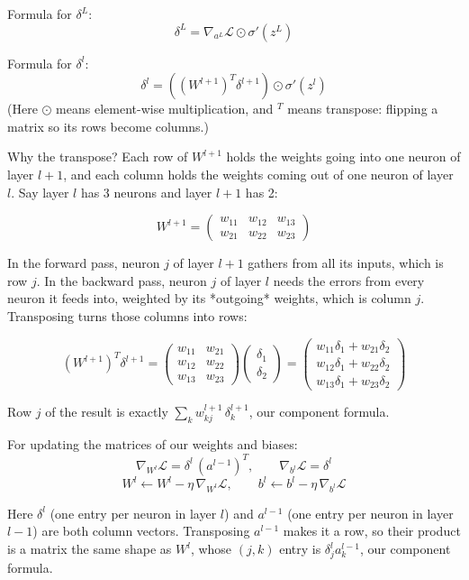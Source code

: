 \documentclass{article}
\begin{document}
Formula for $\delta^L$:
\[\delta^L = \nabla_{a^L}\mathcal{L}\odot\sigma'(z^L)\]

Formula for $\delta^l$:
\[{\delta^l = \left( (W^{l+1})^T \delta^{l+1} \right) \odot \sigma'(z^l)}\]
(Here $\odot$ means element-wise multiplication, and $^T$ means transpose: flipping a matrix so its rows become columns.)

Why the transpose? Each row of $W^{l+1}$ holds the weights going into one neuron of layer $l+1$, and each column holds the weights coming out of one neuron of layer $l$. Say layer $l$ has 3 neurons and layer $l+1$ has 2:

\[W^{l+1} = \begin{pmatrix} w_{11} & w_{12} & w_{13} \\ w_{21} & w_{22} & w_{23} \end{pmatrix}\]

In the forward pass, neuron $j$ of layer $l+1$ gathers from all its inputs, which is row $j$. In the backward pass, neuron $j$ of layer $l$ needs the errors from every neuron it feeds into, weighted by its *outgoing* weights, which is column $j$. Transposing turns those columns into rows:

\[(W^{l+1})^T\delta^{l+1} = \begin{pmatrix} w_{11} & w_{21} \\ w_{12} & w_{22} \\ w_{13} & w_{23} \end{pmatrix}\begin{pmatrix} \delta_1 \\ \delta_2 \end{pmatrix} = \begin{pmatrix} w_{11}\delta_1 + w_{21}\delta_2 \\ w_{12}\delta_1 + w_{22}\delta_2 \\ w_{13}\delta_1 + w_{23}\delta_2 \end{pmatrix}\]

Row $j$ of the result is exactly $\sum_k w^{l+1}_{kj}\,\delta^{l+1}_k$, our component formula.

For updating the matrices of our weights and biases:
\[\nabla_{W^l}\mathcal{L} = \delta^l\,(a^{l-1})^T, \qquad \nabla_{b^l}\mathcal{L} = \delta^l\]
\[W^l \leftarrow W^l - \eta\,\nabla_{W^l}\mathcal{L}, \qquad b^l \leftarrow b^l - \eta\,\nabla_{b^l}\mathcal{L}\]

Here $\delta^l$ (one entry per neuron in layer $l$) and $a^{l-1}$ (one entry per neuron in layer $l-1$) are both column vectors. Transposing $a^{l-1}$ makes it a row, so their product is a matrix the same shape as $W^l$, whose $(j,k)$ entry is $\delta^l_j a^{l-1}_k$, our component formula.
\end{document}

